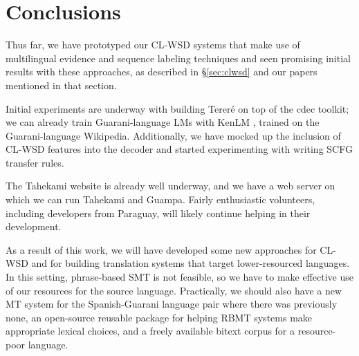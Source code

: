 \chapter{Conclusions}


Thus far, we have prototyped our CL-WSD systems that make use of multilingual
evidence and sequence labeling techniques and seen promising initial results
with these approaches, as described in \S\ref{sec:clwsd} and our papers
mentioned in that section.

Initial experiments are underway with building Tereré on top of the cdec
toolkit; we can already train Guarani-language LMs with KenLM
\cite{Heafield-estimate}, trained on the Guarani-language Wikipedia.
Additionally, we have mocked up the inclusion of CL-WSD features into the
decoder and started experimenting with writing SCFG transfer rules.

The Tahekami website is already well underway, and we have a web server on
which we can run Tahekami and Guampa. Fairly enthusiastic volunteers, including
developers from Paraguay, will likely continue helping in their development.

As a result of this work, we will have developed some new approaches for
CL-WSD and for building translation systems that target lower-resourced
languages. In this setting, phrase-based SMT is not feasible, so we have to
make effective use of our resources for the source language.
Practically, we should also have a new MT system for the Spanish-Guarani
language pair where there was previously none, an open-source reusable
package for helping RBMT systems make appropriate lexical choices, and a freely
available bitext corpus for a resource-poor language.
